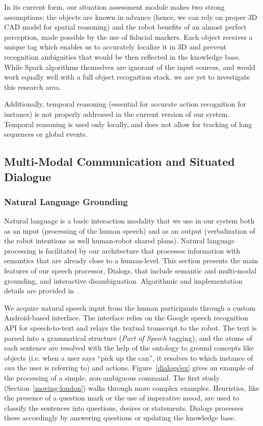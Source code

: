 \documentclass[preprint,3p,times]{elsarticle}
\newcommand{\ie}{i.e.\xspace}
\begin{document}
In its current form, our situation assessment module makes two strong
assumptions: the objects are known in advance (hence, we can rely on proper 3D
CAD model for spatial reasoning) and the robot benefits of an almost perfect
perception, made possible by the use of fiducial markers.  Each object receives
a unique tag which enables us to accurately localize it in 3D and prevent
recognition ambiguities that would be then reflected in the knowledge base.
While {\sc Spark} algorithms themselves are ignorant of the input sources, and
would work equally well with a full object recognition stack, we are yet to
investigate this research area.

Additionally, temporal reasoning (essential for accurate action recognition for
instance) is not properly addressed in the current version of our system. Temporal reasoning is used
only locally, and does not allow for tracking of long sequences or global events.


\subsection{Multi-Modal Communication and Situated Dialogue}
\label{sect|com}

\subsubsection{Natural Language Grounding}

Natural language is a basic interaction modality that we use in our system both
as an input (processing of the human speech) and as an output (verbalization of the
robot intentions as well human-robot shared plans). Natural language processing is facilitated by our architecture
that processes information with semantics that are already close to a
human-level. This section presents the main features of our speech processor,
{\sc Dialogs}, that include semantic and multi-modal grounding, and interactive
disambiguation. Algorithmic and implementation details are provided
in~\cite{Lemaignan2011a}.

We acquire natural speech input from the human participants through a custom
Android-based interface. The interface relies on the Google speech recognition API for
speech-to-text and relays the textual transcript to the robot. The text is parsed into
a grammatical structure (\emph{Part of Speech} tagging), and the atoms of each
sentence are resolved with the help of the ontology to ground concepts like
objects (\ie when a user says ``pick up the can'', it resolves to which instance of
\emph{can} the user is referring to) and actions.  Figure~\ref{dialogs|ex} gives
an example of the processing of a simple, non-ambiguous command. The first
study (Section~\ref{moving-london}) walks through more complex examples.
Heuristics, like the presence of a question mark or the use of imperative mood,
are used to classify the sentences into questions, desires or statements.
{\sc Dialogs} processes these accordingly by answering questions or
updating the knowledge base.
\end{document}

